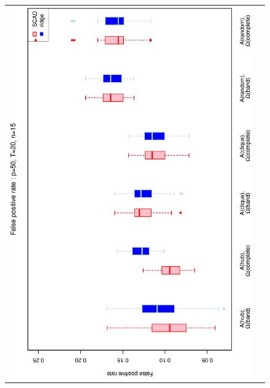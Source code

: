 \documentclass[a4paper]{article}
\begin{document}
\begin{figure}[h!]
\centering
\begin{tabular}{cc}
\includegraphics[scale=0.45,angle=270]{ROCfpr50T20N15_5.eps}
\\

\end{tabular}
\end{figure}
\end{document}
